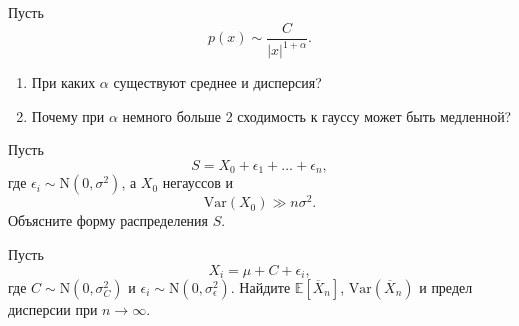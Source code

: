 \documentclass[
  russian,
  11pt,
  a4paper,
  open=any]{scrbook}
\providecommand{\tightlist}{%
  \setlength{\itemsep}{0pt}\setlength{\parskip}{0pt}}
\begin{document}
\begin{semanticpdfbox}[colback=BookCoralSoft,borderline west={1.2mm}{0pt}{BookCoral}]

\par\nopagebreak[4]\vspace{1.2mm}

Пусть \[
p(x)\sim\frac{C}{|x|^{1+\alpha}}.
\]

\begin{enumerate}
\def\labelenumi{\arabic{enumi}.}
\tightlist
\item
  При каких \(\alpha\) существуют среднее и дисперсия?
\item
  Почему при \(\alpha\) немного больше 2 сходимость к гауссу может быть
  медленной?
\end{enumerate}

\end{semanticpdfbox}

\begin{semanticpdfbox}[colback=BookCoralSoft,borderline west={1.2mm}{0pt}{BookCoral}]

\par\nopagebreak[4]\vspace{1.2mm}

Пусть \[
S=X_0+\epsilon_1+\dots+\epsilon_n,
\] где \(\epsilon_i\sim\mathrm{N}(0,\sigma^2)\), а \(X_0\) негауссов и
\[
\mathrm{Var}(X_0)\gg n\sigma^2.
\] Объясните форму распределения \(S\).

\end{semanticpdfbox}

\begin{semanticpdfbox}[colback=BookCoralSoft,borderline west={1.2mm}{0pt}{BookCoral}]

\par\nopagebreak[4]\vspace{1.2mm}

Пусть \[
X_i=\mu+C+\epsilon_i,
\] где \(C\sim\mathrm{N}(0,\sigma_C^2)\) и
\(\epsilon_i\sim\mathrm{N}(0,\sigma_\epsilon^2)\). Найдите
\(\mathbb{E}[\overline X_n]\), \(\mathrm{Var}(\overline X_n)\) и предел
дисперсии при \(n\to\infty\).

\end{semanticpdfbox}
\end{document}
